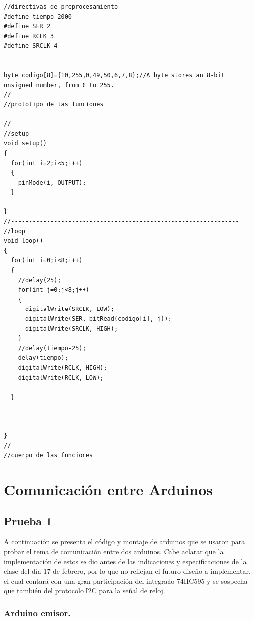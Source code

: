 \documentclass{article}
\begin{document}
\begin{itemize}
\begin{lstlisting}[style=myArduino]
//directivas de preprocesamiento
#define tiempo 2000
#define SER 2
#define RCLK 3
#define SRCLK 4


byte codigo[8]={10,255,0,49,50,6,7,8};//A byte stores an 8-bit unsigned number, from 0 to 255.
//----------------------------------------------------------------
//prototipo de las funciones

//----------------------------------------------------------------
//setup
void setup()
{
  for(int i=2;i<5;i++)
  {
    pinMode(i, OUTPUT);
  }
  
}
//----------------------------------------------------------------
//loop
void loop()
{
  for(int i=0;i<8;i++)
  {
  	//delay(25);
    for(int j=0;j<8;j++)
    {
      digitalWrite(SRCLK, LOW);
      digitalWrite(SER, bitRead(codigo[i], j));
      digitalWrite(SRCLK, HIGH);
    }
    //delay(tiempo-25);
    delay(tiempo);
    digitalWrite(RCLK, HIGH);
    digitalWrite(RCLK, LOW);
    
  }
  
  
  
}
//----------------------------------------------------------------
//cuerpo de las funciones
\end{lstlisting}


\end{itemize}


\vspace{0.5cm}
\noindent


\section{Comunicación entre Arduinos} \label{Comunicación entre Arduinos}
\subsection{Prueba 1}\label{intento1}
A continuación se presenta el código y montaje de arduinos que se usaron para probar el tema de comunicación entre dos arduinos. Cabe aclarar que la implementación de estos se dio antes de las indicaciones y especificaciones de la clase del día 17 de febrero, por lo que no reflejan el futuro diseño a implementar, el cual contará con una gran participación del integrado 74HC595 y se sospecha que también del protocolo I2C para la señal de reloj.

\subsubsection{Arduino emisor.}\label{intento1}
\end{document}
